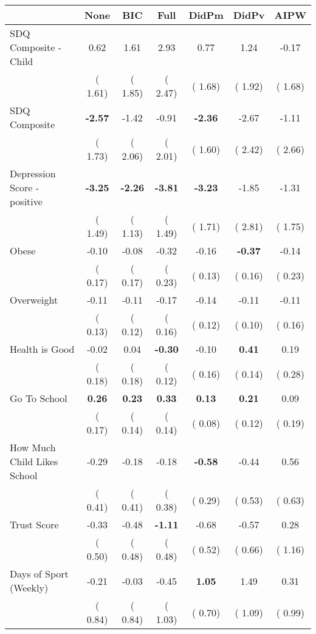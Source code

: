 \begin{tabular}{l c c c c c c}
\toprule
 & None & BIC & Full & DidPm & DidPv & AIPW \\
\midrule
SDQ Composite - Child &      0.62 &      1.61 &      2.93 &      0.77 &      1.24 &     -0.17 \\
& (     1.61) & (     1.85) & (     2.47) & (     1.68) & (     1.92) & (     1.68) \\
SDQ Composite & \textbf{     -2.57 } &     -1.42 &     -0.91 & \textbf{     -2.36 } &     -2.67 &     -1.11 \\
& (     1.73) & (     2.06) & (     2.01) & (     1.60) & (     2.42) & (     2.66) \\
Depression Score - positive & \textbf{     -3.25 } & \textbf{     -2.26 } & \textbf{     -3.81 } & \textbf{     -3.23 } &     -1.85 &     -1.31 \\
& (     1.49) & (     1.13) & (     1.49) & (     1.71) & (     2.81) & (     1.75) \\
Obese &     -0.10 &     -0.08 &     -0.32 &     -0.16 & \textbf{     -0.37 } &     -0.14 \\
& (     0.17) & (     0.17) & (     0.23) & (     0.13) & (     0.16) & (     0.23) \\
Overweight &     -0.11 &     -0.11 &     -0.17 &     -0.14 &     -0.11 &     -0.11 \\
& (     0.13) & (     0.12) & (     0.16) & (     0.12) & (     0.10) & (     0.16) \\
Health is Good &     -0.02 &      0.04 & \textbf{     -0.30 } &     -0.10 & \textbf{      0.41 } &      0.19 \\
& (     0.18) & (     0.18) & (     0.12) & (     0.16) & (     0.14) & (     0.28) \\
Go To School & \textbf{      0.26 } & \textbf{      0.23 } & \textbf{      0.33 } & \textbf{      0.13 } & \textbf{      0.21 } &      0.09 \\
& (     0.17) & (     0.14) & (     0.14) & (     0.08) & (     0.12) & (     0.19) \\
How Much Child Likes School &     -0.29 &     -0.18 &     -0.18 & \textbf{     -0.58 } &     -0.44 &      0.56 \\
& (     0.41) & (     0.41) & (     0.38) & (     0.29) & (     0.53) & (     0.63) \\
Trust Score &     -0.33 &     -0.48 & \textbf{     -1.11 } &     -0.68 &     -0.57 &      0.28 \\
& (     0.50) & (     0.48) & (     0.48) & (     0.52) & (     0.66) & (     1.16) \\
Days of Sport (Weekly) &     -0.21 &     -0.03 &     -0.45 & \textbf{      1.05 } &      1.49 &      0.31 \\
& (     0.84) & (     0.84) & (     1.03) & (     0.70) & (     1.09) & (     0.99) \\
\bottomrule
\end{tabular}
